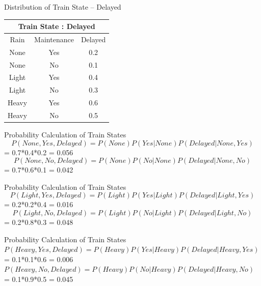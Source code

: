\documentclass{beamer}
\begin{document}
\begin{frame}{Distribution of Train State -- Delayed}
\begin{center}
    \begin{tabular}{|c|c|c|}
         \hline
         \multicolumn{3}{|c|}{Train State : Delayed}\\
         \hline
         Rain & Maintenance & Delayed \\
         \hline
         None & Yes  & 0.2  \\
         \hline
         None & No  & 0.1 \\
         \hline
         Light & Yes  & 0.4  \\
         \hline
         Light & No  & 0.3  \\
         \hline
         Heavy & Yes  & 0.6  \\
         \hline
         Heavy & No  & 0.5  \\
         \hline
    \end{tabular}
\end{center}    
\end{frame}
\begin{frame}{Probability Calculation of Train States}
\begin{equation*}
    P(None,Yes,Delayed) = P(None)P(Yes|None)P(Delayed|None,Yes)
\end{equation*}
= 0.7*0.4*0.2 = 0.056
\newline
\begin{equation*}
    P(None,No,Delayed) = P(None)P(No|None)P(Delayed|None,No)
\end{equation*}
= 0.7*0.6*0.1 = 0.042
\newline
\end{frame}
\begin{frame}{Probability Calculation of Train States}
\begin{equation*}
    P(Light,Yes,Delayed) = P(Light)P(Yes|Light)P(Delayed|Light,Yes)
\end{equation*}
= 0.2*0.2*0.4 = 0.016
\newline
\begin{equation*}
    P(Light,No,Delayed) = P(Light)P(No|Light)P(Delayed|Light,No)
\end{equation*}
= 0.2*0.8*0.3 = 0.048
\newline
\end{frame}
\begin{frame}{Probability Calculation of Train States}
$P(Heavy,Yes,Delayed)=P(Heavy)P(Yes|Heavy)P(Delayed|Heavy,Yes)$ \newline
= 0.1*0.1*0.6 = 0.006
\newline\newline
    $P(Heavy,No,Delayed) = P(Heavy)P(No|Heavy)P(Delayed|Heavy,No)$\newline
= 0.1*0.9*0.5 = 0.045 
\newline
\end{frame}
\end{document}
